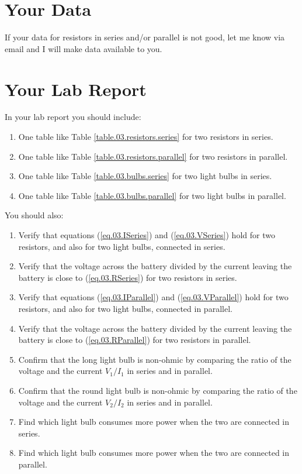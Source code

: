 \section{Your Data}
If your data for resistors in series and/or parallel is not good, let me know via email and I will make data available to you.
\section{Your Lab Report}
In your lab report you should include:
\begin{enumerate}
	\item One table like Table \ref{table.03.resistors.series} for two resistors in series.
	\item One table like Table \ref{table.03.resistors.parallel} for two resistors in parallel.
	\item One table like Table \ref{table.03.bulbs.series} for two light bulbs in series.
	\item One table like Table \ref{table.03.bulbs.parallel} for two light bulbs in parallel.
\end{enumerate}
You should also:
\begin{enumerate}
	\item Verify that equations (\ref{eq.03.ISeries}) and (\ref{eq.03.VSeries}) hold for two resistors, and also for two light bulbs, connected in series.
	\item Verify that the voltage across the battery divided by the current leaving the battery is close to (\ref{eq.03.RSeries}) for two resistors in series.
	\item Verify that equations (\ref{eq.03.IParallel}) and (\ref{eq.03.VParallel}) hold for two resistors, and also for two light bulbs, connected in parallel.
	\item Verify that the voltage across the battery divided by the current leaving the battery is close to (\ref{eq.03.RParallel}) for two resistors in parallel.
	\item Confirm that the long light bulb is non-ohmic by comparing the ratio of the voltage and the current $V_{1} / I_{1}$ in series and in parallel.
	\item Confirm that the round light bulb is non-ohmic by comparing the ratio of the voltage and the current $V_{2} / I_{2}$ in series and in parallel.
	\item Find which light bulb consumes more power when the two are connected in series.
	\item Find which light bulb consumes more power when the two are connected in parallel.
\end{enumerate}